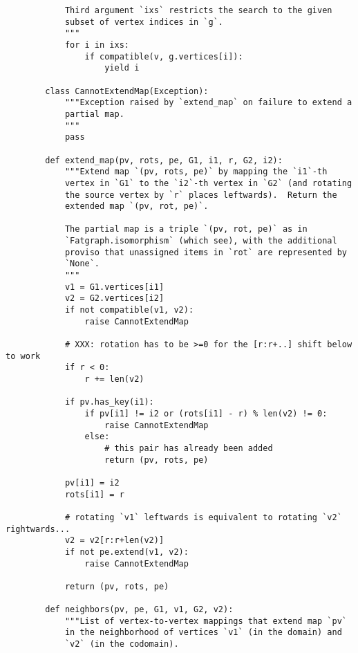 \begin{lstlisting}
            Third argument `ixs` restricts the search to the given
            subset of vertex indices in `g`.
            """
            for i in ixs:
                if compatible(v, g.vertices[i]):
                    yield i

        class CannotExtendMap(Exception):
            """Exception raised by `extend_map` on failure to extend a
            partial map.
            """
            pass

        def extend_map(pv, rots, pe, G1, i1, r, G2, i2):
            """Extend map `(pv, rots, pe)` by mapping the `i1`-th
            vertex in `G1` to the `i2`-th vertex in `G2` (and rotating
            the source vertex by `r` places leftwards).  Return the
            extended map `(pv, rot, pe)`.

            The partial map is a triple `(pv, rot, pe)` as in
            `Fatgraph.isomorphism` (which see), with the additional
            proviso that unassigned items in `rot` are represented by
            `None`.
            """
            v1 = G1.vertices[i1]
            v2 = G2.vertices[i2]
            if not compatible(v1, v2):
                raise CannotExtendMap

            # XXX: rotation has to be >=0 for the [r:r+..] shift below to work
            if r < 0:
                r += len(v2)

            if pv.has_key(i1):
                if pv[i1] != i2 or (rots[i1] - r) % len(v2) != 0:
                    raise CannotExtendMap
                else:
                    # this pair has already been added
                    return (pv, rots, pe)

            pv[i1] = i2
            rots[i1] = r

            # rotating `v1` leftwards is equivalent to rotating `v2` rightwards...
            v2 = v2[r:r+len(v2)]
            if not pe.extend(v1, v2):
                raise CannotExtendMap

            return (pv, rots, pe)

        def neighbors(pv, pe, G1, v1, G2, v2):
            """List of vertex-to-vertex mappings that extend map `pv`
            in the neighborhood of vertices `v1` (in the domain) and
            `v2` (in the codomain).


\end{lstlisting}
